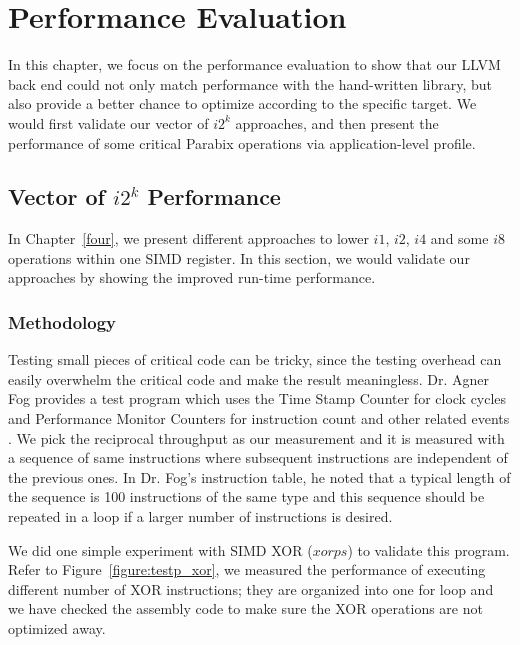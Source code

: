 %
%

\chapter{Performance Evaluation}
\label{six}

In this chapter, we focus on the performance evaluation to show that our LLVM back end could not only match performance with the hand-written library, but also provide a better chance to optimize according to the specific target. We would first validate our vector of $i2^k$ approaches, and then present the performance of some critical Parabix operations via application-level profile.

\section{Vector of $i2^k$ Performance}
In Chapter~\ref{four}, we present different approaches to lower $i1$, $i2$, $i4$ and some $i8$ operations within one SIMD register. In this section, we would validate our approaches by showing the improved run-time performance.

\subsection{Methodology}

Testing small pieces of critical code can be tricky, since the testing overhead can easily overwhelm the critical code and make the result meaningless. Dr. Agner Fog provides a test program which uses the Time Stamp Counter for clock cycles and Performance Monitor Counters for instruction count and other related events \cite{agner_testp}. We pick the reciprocal throughput as our measurement and it is measured with a sequence of same instructions where subsequent instructions are independent of the previous ones. In Dr. Fog's instruction table, he noted that a typical length of the sequence is 100 instructions of the same type and this sequence should be repeated in a loop if a larger number of instructions is desired.

We did one simple experiment with SIMD XOR ($xorps$) to validate this program. Refer to Figure~\ref{figure:testp_xor}, we measured the performance of executing different number of XOR instructions; they are organized into one for loop and we have checked the assembly code to make sure the XOR operations are not optimized away.

